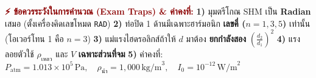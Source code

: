 \documentclass[10pt, a5paper]{article}
\begin{document}
\begin{tcolorbox}[colback=white, colframe=darkred, boxrule=0.7pt, arc=1.5pt, left=3pt, right=3pt, top=2pt, bottom=2pt]
{\fontsize{7.5}{9}\selectfont
\textcolor{darkred}{\textbf{⚡ ข้อควรระวังในการคำนวณ (Exam Traps) \& ค่าคงที่:}}
\textbf{1)} มุมตรีโกณ SHM เป็น \textbf{Radian} เสมอ (ตั้งเครื่องคิดเลขโหมด \texttt{RAD}) \quad
\textbf{2)} ท่อปิด 1 ด้านมีเฉพาะฮาร์มอนิก \textbf{เลขคี่ ($n=1,3,5$)} เท่านั้น (โอเวอร์โทน 1 คือ $n=3$) \quad
\textbf{3)} แม่แรงไฮดรอลิกส์ถ้าให้ $d$ มาต้อง \textbf{ยกกำลังสอง} $\left(\frac{d_2}{d_1}\right)^2$ \quad
\textbf{4)} แรงลอยตัวใช้ $\rho_{\text{เหลว}}$ และ $V$ \textbf{เฉพาะส่วนที่จม} \quad
\textbf{5)} ค่าคงที่: $P_{\text{atm}} = 1.013 \times 10^5\,\text{Pa}, \quad \rho_{\text{น้ำ}} = 1,000\,\text{kg/m}^3, \quad I_0 = 10^{-12}\,\text{W/m}^2$
}
\end{tcolorbox}
\end{document}
